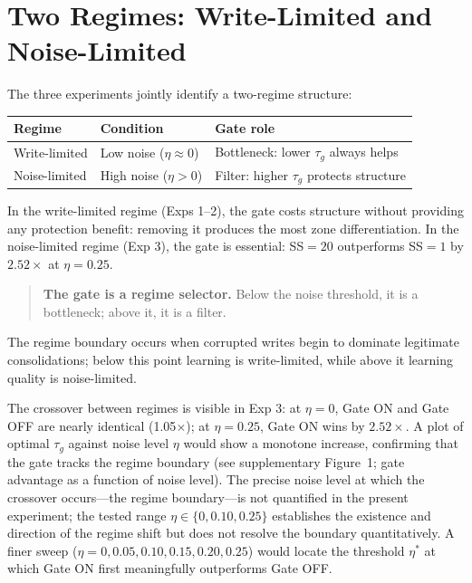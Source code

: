 \documentclass[11pt,twocolumn]{article}
\begin{document}
\section{Two Regimes: Write-Limited and Noise-Limited}

The three experiments jointly identify a two-regime structure:

\begin{center}
\begin{tabular}{lll}
\toprule
\textbf{Regime} & \textbf{Condition} & \textbf{Gate role} \\
\midrule
Write-limited & Low noise ($\eta \approx 0$) & Bottleneck: lower $\tau_g$ always helps \\
Noise-limited & High noise ($\eta > 0$) & Filter: higher $\tau_g$ protects structure \\
\bottomrule
\end{tabular}
\end{center}

In the write-limited regime (Exps 1--2), the gate costs structure without providing
any protection benefit: removing it produces the most zone differentiation.
In the noise-limited regime (Exp 3), the gate is essential: SS$=20$ outperforms
SS$=1$ by $2.52\times$ at $\eta = 0.25$.

\begin{quote}
\textbf{The gate is a regime selector.}
Below the noise threshold, it is a bottleneck; above it, it is a filter.
\end{quote}

The regime boundary occurs when corrupted writes begin to dominate legitimate consolidations; below this point learning is write-limited, while above it learning quality is noise-limited.

The crossover between regimes is visible in Exp 3: at $\eta = 0$, Gate ON and
Gate OFF are nearly identical (1.05$\times$); at $\eta = 0.25$, Gate ON wins by
$2.52\times$. A plot of optimal $\tau_g$ against noise level $\eta$ would show a
monotone increase, confirming that the gate tracks the regime boundary (see
supplementary Figure~1; gate advantage as a function of noise level).
The precise noise level at which the crossover occurs---the regime boundary---is
not quantified in the present experiment; the tested range $\eta \in \{0, 0.10, 0.25\}$
establishes the existence and direction of the regime shift but does not resolve
the boundary quantitatively.
A finer sweep ($\eta = 0, 0.05, 0.10, 0.15, 0.20, 0.25$) would locate the
threshold $\eta^*$ at which Gate ON first meaningfully outperforms Gate OFF.
\end{document}
